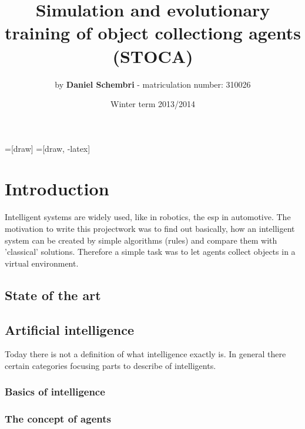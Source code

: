 \documentclass[10pt,a4paper,DIV=11]{scrreprt}
\title
{
    Simulation and evolutionary training of object collectiong agents (STOCA)\\
}
\author
{
    by \textbf{Daniel Schembri} - matriculation number: 310026
}
\date
{
    Winter term 2013/2014
}
\begin{document}
=[draw]
=[draw, -latex] 


\maketitle
\thispagestyle{empty}
\newpage
{\large\tableofcontents}
\newpage

% 
%
%
%
%



\chapter{Introduction}
Intelligent systems are widely used, like in robotics, the esp in automotive.
The motivation to write this projectwork was
to find out basically, how an intelligent system can be created by simple algorithms (rules) and compare them with 'classical' solutions. Therefore a simple task was to let agents collect objects in a virtual environment.





\section{State of the art}

\section{Artificial intelligence}
Today there is not a definition of what intelligence exactly is.
In general there certain categories focusing parts to describe of
intelligents.

\subsection{}

\subsection{Basics of intelligence}

\subsection{The concept of agents}
\end{document}
